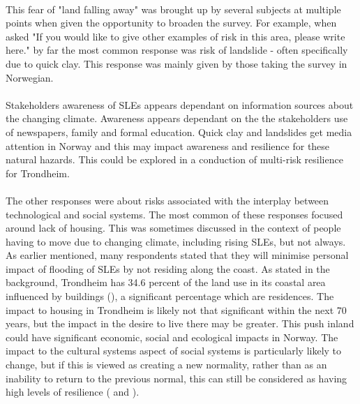\paragraph{}
This fear of "land falling away" was brought up by several subjects at multiple points when given the opportunity to broaden the survey. For example, when asked "If you would like to give other examples of risk in this area, please write here." by far the most common response was risk of landslide - often specifically due to quick clay. This response was mainly given by those taking the survey in Norwegian. 
\paragraph{}
Stakeholders awareness of SLEs appears dependant on information sources about the changing climate. Awareness appears dependant on the the stakeholders use of newspapers, family and formal education. Quick clay and landslides get media attention in Norway and this may impact awareness and resilience for these natural hazards. This could be explored in a conduction of multi-risk resilience for Trondheim.  
\paragraph{}
The other responses were about risks associated with the interplay between technological and social systems. The most common of these responses focused around lack of housing. This was sometimes discussed in the context of people having to move due to changing climate, including rising SLEs, but not always.  As earlier mentioned, many respondents stated that they will minimise personal impact of flooding of SLEs by not residing along the coast.  As stated in the background, Trondheim has 34.6 percent of the land use in its coastal area influenced by buildings (\cite{engebakken_construction_2022}), a significant percentage which are residences. The impact to housing in Trondheim is likely not that significant within the next 70 years, but the impact in the desire to live there may be greater. This push inland could have significant economic, social and ecological impacts in Norway. The impact to the cultural systems aspect of social systems is particularly likely to change, but if this is viewed as creating a new normality, rather than as an inability to return to the previous normal, this can still be considered as having high levels of resilience (\cite{cutter_place-based_2008} and \cite{cutter_community_2020}).
\paragraph{}




